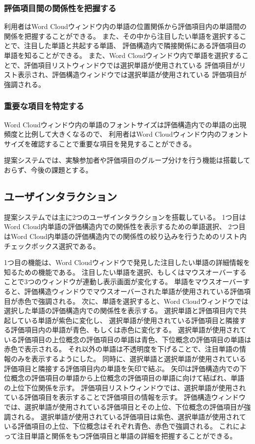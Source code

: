 \documentclass[syuuron]{kuee}
\begin{document}
			\subsubsection{評価項目間の関係性を把握する}
				利用者はWord Cloudウィンドウ内の単語の位置関係から評価項目内の単語間の関係を把握することができる。
				また、その中から注目したい単語を選択することで、注目した単語と共起する単語、
				評価構造内で隣接関係にある評価項目の単語を知ることができる。
				また、Word Cloudウィンドウ内で単語を選択することで、評価項目リストウィンドウでは選択単語が使用されている
				評価項目がリスト表示され、評価構造ウィンドウでは選択単語が使用されている
				評価項目が強調される。
			\subsubsection{重要な項目を特定する}
				Word Cloudウィンドウ内の単語のフォントサイズは評価構造内での単語の出現頻度と比例して大きくなるので、
				利用者はWord Cloudウィンドウ内のフォントサイズを確認することで重要な項目を発見することができる。
			
			提案システムでは、実験参加者や評価項目のグループ分けを行う機能は搭載しておらず、今後の課題とする。			
			
		\subsection{ユーザインタラクション}
			提案システムでは主に2つのユーザインタラクションを搭載している。
			1つ目はWord Cloud内単語の評価構造内での関係性を表示するための単語選択、
			2つ目はWord Cloud内単語の評価構造内での関係性の絞り込みを行うためのリスト内チェックボックス選択である。
			
			1つ目の機能は、Word Cloudウィンドウで発見した注目したい単語の詳細情報を知るための機能である。
			注目したい単語を選択、もしくはマウスオーバーすることで3つのウィンドウが連動し表示画面が変化する。
			単語をマウスオーバーすると、評価構造ウィンドウでマウスオーバーされた単語が使用されている評価項目が赤色で強調される。
			次に、単語を選択すると、Word Cloudウィンドウでは選択した単語の評価構造内での関係性を表示する。
			選択単語と評価項目内で共起している単語が紫色に変化し、
			選択単語が使用されている評価項目と隣接する評価項目内の単語が青色、もしくは赤色に変化する。
			選択単語が使用されている評価項目の上位概念の評価項目の単語は青色、下位概念の評価項目の単語は赤色で表示される。
			それ以外の単語は不透明度を下げることで、注目単語の情報のみを表示するようにした。
			同時に、選択単語と選択単語が使用されている評価項目と隣接する評価項目内の単語を矢印で結ぶ。
			矢印は評価構造内での下位概念の評価項目の単語から上位概念の評価項目の単語に向けて結ばれ、単語の上位下位関係を示す。
			評価項目リストウィンドウでは、選択単語が使用されている評価項目を表示することで評価項目の情報を示す。
			評価構造ウィンドウでは、選択単語が使用されている評価項目とその上位、下位概念の評価項目が強調される。
			選択単語が使用されている評価項目は紫色、選択単語が使用されている評価項目の上位、下位概念はそれぞれ青色、赤色で強調される。
			これによって注目単語と関係をもつ評価項目と単語の詳細を把握することができる。
			
\end{document}
